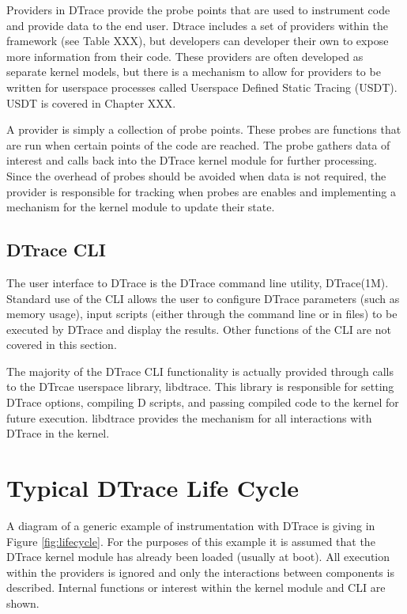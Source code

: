 Providers in DTrace provide the probe points that are used to
instrument code and provide data to the end user. Dtrace includes a
set of providers within the framework (see Table XXX), but developers
can developer their own to expose more information from their
code. These providers are often developed as separate kernel models,
but there is a mechanism to allow for providers to be written for
userspace processes called Userspace Defined Static Tracing
(USDT). USDT is covered in Chapter XXX.

A provider is simply a collection of probe points. These probes are
functions that are run when certain points of the code are
reached. The probe gathers data of interest and calls back into the
DTrace kernel module for further processing. Since the overhead of
probes should be avoided when data is not required, the provider is
responsible for tracking when probes are enables and implementing a
mechanism for the kernel module to update their state.

\subsection{DTrace CLI}

The user interface to DTrace is the DTrace command line utility,
DTrace(1M). Standard use of the CLI allows the user to configure
DTrace parameters (such as memory usage), input scripts (either
through the command line or in files) to be executed by DTrace and
display the results. Other functions of the CLI are not covered in
this section.

The majority of the DTrace CLI functionality is actually provided
through calls to the DTrcae userspace library, libdtrace. This library
is responsible for setting DTrace options, compiling D scripts, and
passing compiled code to the kernel for future execution. libdtrace
provides the mechanism for all interactions with DTrace in the kernel.

\section{Typical DTrace Life Cycle}

A diagram of a generic example of instrumentation with DTrace is
giving in Figure \ref{fig:lifecycle}. For the purposes of this example
it is assumed that the DTrace kernel module has already been loaded
(usually at boot). All execution within the providers is ignored and
only the interactions between components is described. Internal
functions or interest within the kernel module and CLI are shown.

